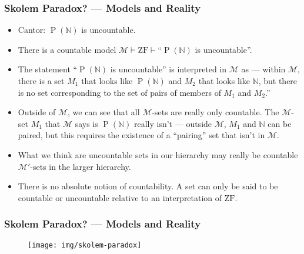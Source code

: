\documentclass[UTF8,aspectratio=43,11pt,colorlinks,compress,openany]{beamer}%
\begin{document}
\begin{frame}\frametitle{Skolem Paradox? --- Models and Reality}
	\begin{itemize}
		\item Cantor: $\operatorname{P}(\mathbb{N})$ is uncountable.
		\item There is a countable model $\mathcal{M}\vDash \mathrm{ZF}\vdash$``$\operatorname{P}(\mathbb{N})$ is uncountable''.
		\item The statement ``$\operatorname{P}(\mathbb{N})$ is uncountable'' is interpreted in $\mathcal{M}$ as --- within $\mathcal{M}$, there is a set $M_1$ that looks like $\operatorname{P}(\mathbb{N})$ and $M_2$ that looks like $\mathbb{N}$, but there is no set corresponding to the set of pairs of members of $M_1$ and $M_2$.''
		\item Outside of $\mathcal{M}$, we can see that all $\mathcal{M}$-sets are really only countable. The $\mathcal{M}$-set $M_1$ that $\mathcal{M}$ says is $\operatorname{P}(\mathbb{N})$ really isn't --- outside $\mathcal{M}$, $M_1$ and $\mathbb{N}$ can be paired, but this requires the existence of a ``pairing'' set that isn't in $\mathcal{M}$.
		\item What we think are uncountable sets in our hierarchy may really be countable $\mathcal{M}'$-sets in the larger hierarchy.
		\item There is no absolute notion of countability. A set can only be said to be countable or uncountable relative to an interpretation of $\mathrm{ZF}$.
	\end{itemize}
\end{frame}

\begin{frame}\frametitle{Skolem Paradox? --- Models and Reality}
	\begin{figure}
		\texttt{[image: img/skolem-paradox]}
	\end{figure}
\end{frame}
\end{document}
